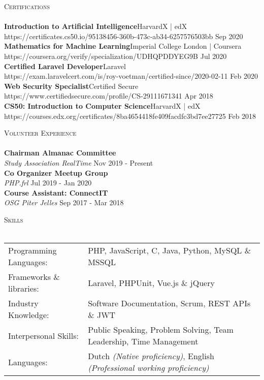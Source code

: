 \documentclass[a4paper]{article}
\newcommand{\lineunder} {
    \vspace*{-8pt} \\
    \hspace*{-18pt} \hrulefill \\
}
\newcommand{\header} [1] {
    {\hspace*{-18pt}\vspace*{6pt} \textsc{#1}}
    \vspace*{-6pt} \lineunder
}
\begin{document}
\header{Certifications}
\textbf{Introduction to Artificial Intelligence}\hfill HarvardX | edX\\
https://certificates.cs50.io/95138456-360b-473c-ab34-6257576503bb \hfill Sep 2020\\
\vspace{2mm}
\textbf{Mathematics for Machine Learning}\hfill Imperial College London | Coursera\\
https://coursera.org/verify/specialization/UDHQPDDYEG9B \hfill Jul 2020\\
\vspace{2mm}
\textbf{Certified Laravel Developer}\hfill Laravel\\
https://exam.laravelcert.com/is/roy-voetman/certified-since/2020-02-11 \hfill Feb 2020\\
\vspace{2mm}
\textbf{Web Security Specialist}\hfill Certified Secure\\
https://www.certifiedsecure.com/profile/CS-29111671341 \hfill Apr 2018\\
\vspace{2mm}
\textbf{CS50: Introduction to Computer Science}\hfill HarvardX | edX\\
https://courses.edx.org/certificates/8ba4654418fe409facdfc3bd7ee27725 \hfill Feb 2018\\
\vspace{2mm}

\header{Volunteer Experience}
\vspace{1mm}
\textbf{Chairman Almanac Committee} \hfill\\
\textit{Study Association RealTime} \hfill Nov 2019 - Present\\
\vspace{2mm}
\textbf{Co Organizer Meetup Group} \hfill\\
\textit{PHP.frl} \hfill Jul 2019 - Jan 2020\\
\vspace{2mm}
\textbf{Course Assistant: ConnectIT} \hfill\\
\textit{OSG Piter Jelles} \hfill Sep 2017 - Mar 2018\\
\vspace{2mm}

\header{Skills}
\begin{tabular}{l l}
	Programming Languages:   & PHP, JavaScript, C, Java, Python, MySQL \& MSSQL                     \\
    Frameworks \& libraries: & Laravel, PHPUnit, Vue.js \& jQuery                                   \\
	Industry Knowledge:      & Software Documentation, Scrum, REST APIs \& JWT    \\
	Interpersonal Skills:    & Public Speaking, Problem Solving, Team Leadership, Time Management \\
    Languages:               & Dutch \emph{(Native proficiency)}, English \emph{(Professional working proficiency)}\\
\end{tabular}
\vspace{2mm}
\end{document}
